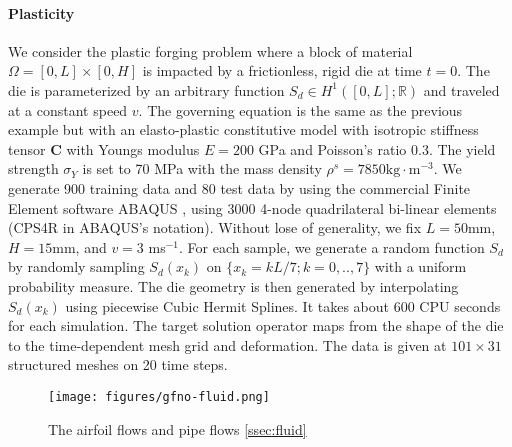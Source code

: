 \documentclass{article}
\begin{document}
\paragraph{Plasticity}
We consider the plastic forging problem where a block of material $\Omega = [0,L] \times [0,H]$ is impacted by a frictionless, rigid die at time $t = 0$. The die is parameterized by an arbitrary function $S_d \in H^1([0,L];\mathbb{R})$ and traveled at a constant speed $v$. The governing equation is the same as the previous example but with an elasto-plastic constitutive model 
with isotropic stiffness tensor $\mathbf{C}$ with Youngs modulus $E = 200$ GPa and Poisson's ratio 0.3. The yield strength $\sigma_Y$ is set to 70 MPa with the mass density $\rho^s = 7850 \text{kg}\cdot \text{m}^{-3}$.  
We generate 900 training data and 80 test data by using the commercial Finite Element software ABAQUS \cite{0b112d0e5eba4b7f9768cfe1d818872e}, using 3000 4-node quadrilateral bi-linear elements (CPS4R in ABAQUS's notation). Without lose of generality, we fix $L = 50$mm, $H = 15 $mm, and $v = 3$ ms$^{-1}$. For each sample, we generate a random function $S_d$ by randomly sampling $S_d(x_k)$ on $\{x_k = k L/7; k = 0,..,7\}$ with a uniform probability measure. The die geometry is then generated by interpolating $S_d(x_k)$ using piecewise Cubic Hermit Splines. It takes about 600 CPU seconds for each simulation. The target solution operator maps from the shape of the die to the time-dependent mesh grid and deformation. The data is given at $101\times31$ structured meshes on 20 time steps.   

\begin{figure}
    \centering
    \texttt{[image: figures/gfno-fluid.png]}
    \caption{The airfoil flows and pipe flows \ref{ssec:fluid}}
    \label{fig:fluid}
\end{figure}
\end{document}
